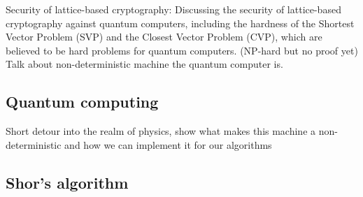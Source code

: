 Security of lattice-based cryptography: Discussing the security of lattice-based cryptography against quantum computers, including the hardness of the Shortest Vector Problem (SVP) and the Closest Vector Problem (CVP), which are believed to be hard problems for quantum computers. (NP-hard but no proof yet) \\
Talk about non-deterministic machine the quantum computer is.
\cite{stanford}

\subsection{Quantum computing}
Short detour into the realm of physics, show what makes this machine a non-deterministic and how we can implement it for our algorithms


\subsection{Shor's algorithm}
 